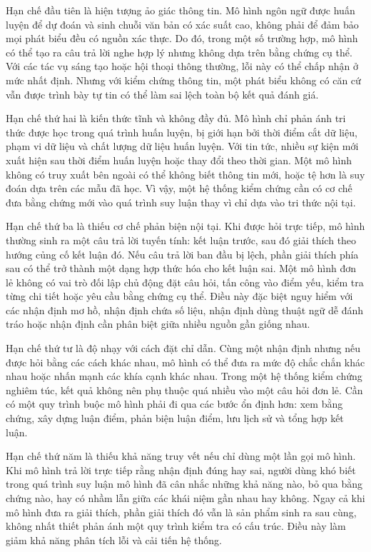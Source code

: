 ﻿\documentclass[oneside,a4paper,12pt]{extreport}
\begin{document}
Hạn chế đầu tiên là hiện tượng ảo giác thông tin. Mô hình ngôn ngữ được huấn luyện để dự đoán và sinh chuỗi văn bản có xác suất cao, không phải để đảm bảo mọi phát biểu đều có nguồn xác thực. Do đó, trong một số trường hợp, mô hình có thể tạo ra câu trả lời nghe hợp lý nhưng không dựa trên bằng chứng cụ thể. Với các tác vụ sáng tạo hoặc hội thoại thông thường, lỗi này có thể chấp nhận ở mức nhất định. Nhưng với kiểm chứng thông tin, một phát biểu không có căn cứ vẫn được trình bày tự tin có thể làm sai lệch toàn bộ kết quả đánh giá.

Hạn chế thứ hai là kiến thức tĩnh và không đầy đủ. Mô hình chỉ phản ánh tri thức được học trong quá trình huấn luyện, bị giới hạn bởi thời điểm cắt dữ liệu, phạm vi dữ liệu và chất lượng dữ liệu huấn luyện. Với tin tức, nhiều sự kiện mới xuất hiện sau thời điểm huấn luyện hoặc thay đổi theo thời gian. Một mô hình không có truy xuất bên ngoài có thể không biết thông tin mới, hoặc tệ hơn là suy đoán dựa trên các mẫu đã học. Vì vậy, một hệ thống kiểm chứng cần có cơ chế đưa bằng chứng mới vào quá trình suy luận thay vì chỉ dựa vào tri thức nội tại.

Hạn chế thứ ba là thiếu cơ chế phản biện nội tại. Khi được hỏi trực tiếp, mô hình thường sinh ra một câu trả lời tuyến tính: kết luận trước, sau đó giải thích theo hướng củng cố kết luận đó. Nếu câu trả lời ban đầu bị lệch, phần giải thích phía sau có thể trở thành một dạng hợp thức hóa cho kết luận sai. Một mô hình đơn lẻ không có vai trò đối lập chủ động đặt câu hỏi, tấn công vào điểm yếu, kiểm tra từng chi tiết hoặc yêu cầu bằng chứng cụ thể. Điều này đặc biệt nguy hiểm với các nhận định mơ hồ, nhận định chứa số liệu, nhận định dùng thuật ngữ dễ đánh tráo hoặc nhận định cần phân biệt giữa nhiều nguồn gần giống nhau.

Hạn chế thứ tư là độ nhạy với cách đặt chỉ dẫn. Cùng một nhận định nhưng nếu được hỏi bằng các cách khác nhau, mô hình có thể đưa ra mức độ chắc chắn khác nhau hoặc nhấn mạnh các khía cạnh khác nhau. Trong một hệ thống kiểm chứng nghiêm túc, kết quả không nên phụ thuộc quá nhiều vào một câu hỏi đơn lẻ. Cần có một quy trình buộc mô hình phải đi qua các bước ổn định hơn: xem bằng chứng, xây dựng luận điểm, phản biện luận điểm, lưu lịch sử và tổng hợp kết luận.

Hạn chế thứ năm là thiếu khả năng truy vết nếu chỉ dùng một lần gọi mô hình. Khi mô hình trả lời trực tiếp rằng nhận định đúng hay sai, người dùng khó biết trong quá trình suy luận mô hình đã cân nhắc những khả năng nào, bỏ qua bằng chứng nào, hay có nhầm lẫn giữa các khái niệm gần nhau hay không. Ngay cả khi mô hình đưa ra giải thích, phần giải thích đó vẫn là sản phẩm sinh ra sau cùng, không nhất thiết phản ánh một quy trình kiểm tra có cấu trúc. Điều này làm giảm khả năng phân tích lỗi và cải tiến hệ thống.
\end{document}
